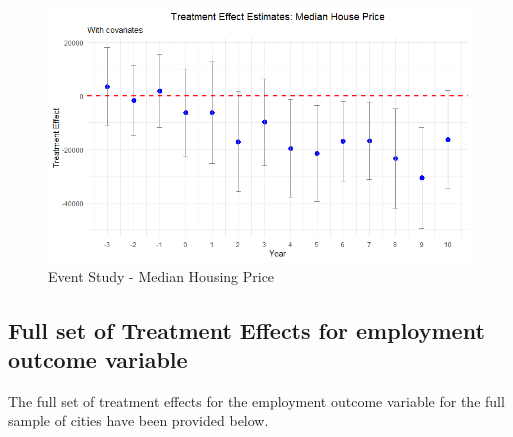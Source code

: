 \begin{figure}[htbp]
    \centering
    \includegraphics[width=\textwidth,keepaspectratio]{images/tes_gs.png}
    \caption{Event Study - Median Housing Price}
    \label{fig:tes_gs_app}
\end{figure}

\clearpage

\subsection{Full set of Treatment Effects for employment outcome variable}

The full set of treatment effects for the employment outcome variable for the full sample of cities have been provided below.

